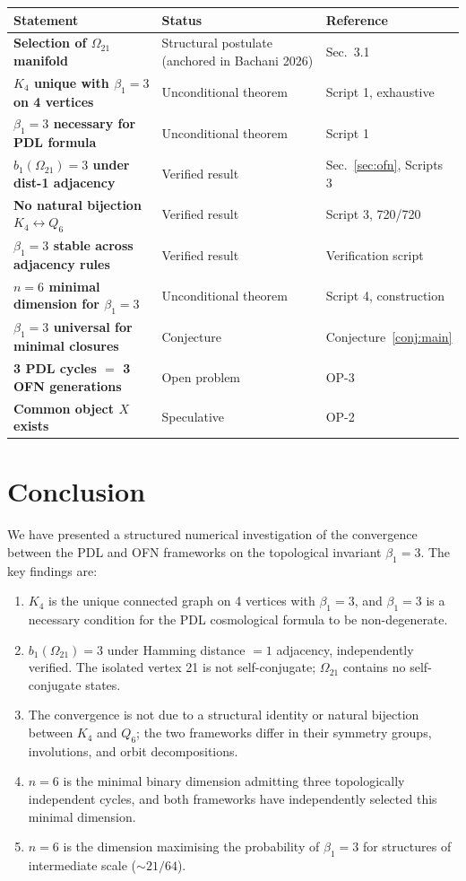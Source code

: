 \documentclass[11pt,a4paper]{article}
\begin{document}
\begin{center}
\begin{tabular}{>{\bfseries}p{5cm} p{4cm} p{4.5cm}}
\toprule
Statement & Status & Reference \\
\midrule
Selection of $\Omega_{21}$ manifold & Structural postulate (anchored in Bachani 2026) & Sec.~3.1 \\
$K_4$ unique with $\beta_1=3$ on 4 vertices & Unconditional theorem & Script 1, exhaustive \\
$\beta_1 = 3$ necessary for PDL formula & Unconditional theorem & Script 1 \\
$b_1(\Omega_{21}) = 3$ under dist-1 adjacency & Verified result & Sec.~\ref{sec:ofn}, Scripts 3 \\
No natural bijection $K_4 \leftrightarrow Q_6$ & Verified result & Script 3, 720/720 \\
$\beta_1=3$ stable across adjacency rules & Verified result & Verification script \\
$n=6$ minimal dimension for $\beta_1=3$ & Unconditional theorem & Script 4, construction \\
$\beta_1=3$ universal for minimal closures & Conjecture & Conjecture~\ref{conj:main} \\
3 PDL cycles $=$ 3 OFN generations & Open problem & OP-3 \\
Common object $X$ exists & Speculative & OP-2 \\
\bottomrule
\end{tabular}
\end{center}

\section{Conclusion}
\label{sec:conclusion}

We have presented a structured numerical investigation of the convergence between the PDL and OFN frameworks on the topological invariant $\beta_1 = 3$. The key findings are:

\begin{enumerate}
\item $K_4$ is the unique connected graph on 4 vertices with $\beta_1 = 3$, and $\beta_1 = 3$ is a necessary condition for the PDL cosmological formula to be non-degenerate.
\item $b_1(\Omega_{21}) = 3$ under Hamming distance $= 1$ adjacency, independently verified. The isolated vertex 21 is not self-conjugate; $\Omega_{21}$ contains no self-conjugate states.
\item The convergence is not due to a structural identity or natural bijection between $K_4$ and $Q_6$; the two frameworks differ in their symmetry groups, involutions, and orbit decompositions.
\item $n = 6$ is the minimal binary dimension admitting three topologically independent cycles, and both frameworks have independently selected this minimal dimension.
\item $n = 6$ is the dimension maximising the probability of $\beta_1 = 3$ for structures of intermediate scale ($\sim 21/64$).
\end{enumerate}
\end{document}
